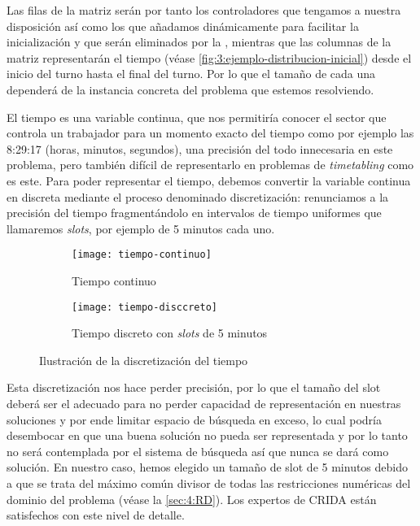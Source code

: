 Las filas de la matriz serán por tanto los controladores que tengamos a nuestra disposición así como los que añadamos dinámicamente para facilitar la inicialización y que serán eliminados por la \fasedos{}, mientras que las columnas de la matriz representarán el tiempo (véase \autoref{fig:3:ejemplo-distribucion-inicial}) desde el inicio del turno hasta el final del turno. Por lo que el tamaño de cada una dependerá de la instancia concreta del problema que estemos 
resolviendo.

El tiempo es una variable continua, que nos permitiría conocer el sector que controla un trabajador para un momento exacto del tiempo como por ejemplo las 8:29:17 (horas, minutos, segundos), una precisión del todo innecesaria en este problema, pero también difícil de representarlo en problemas de \textit{timetabling} como es este. Para poder 
representar el tiempo, debemos convertir la variable continua en discreta mediante el proceso denominado 
discretización: renunciamos a la precisión del tiempo fragmentándolo en intervalos de tiempo uniformes que llamaremos \textit{slots}, por ejemplo de 5 minutos cada uno.

\begin{figure}[htbp]
	\begin{subfigure}{\linewidth}
		\centering
		\texttt{[image: tiempo-continuo]}
		\caption{Tiempo continuo}
		\label{fig:timepo-continuo}
	\end{subfigure}
	
	\begin{subfigure}{\linewidth}
		\centering
		\texttt{[image: tiempo-disccreto]}
		\caption{Tiempo discreto con \textit{slots} de 5 minutos}
		\label{fig:timepo-disccreto}
	\end{subfigure}
	
	\caption{Ilustración de la discretización del tiempo}
\end{figure}

Esta discretización nos hace perder precisión, por lo que el tamaño del slot deberá ser el adecuado para no perder capacidad de representación en nuestras soluciones y por ende limitar espacio de búsqueda en exceso, lo cual podría desembocar en que una buena solución no pueda ser representada y por lo tanto no será contemplada por el sistema de búsqueda así que nunca se dará como solución.
En nuestro caso, hemos elegido un tamaño de slot de 5 minutos debido a que se trata del máximo común divisor de todas las restricciones numéricas del dominio del problema (véase la \autoref{sec:4:RD}). Los expertos de \gls{CRIDA} están satisfechos con este nivel de detalle.

